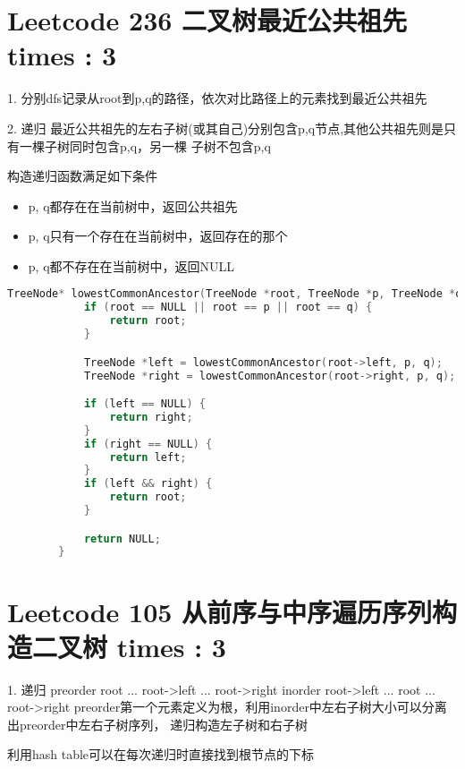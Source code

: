 \documentclass[UTF8]{ctexart}
\begin{document}
\section{Leetcode 236 二叉树最近公共祖先 times : 3}
1. 分别dfs记录从root到p,q的路径，依次对比路径上的元素找到最近公共祖先

2. 递归
最近公共祖先的左右子树(或其自己)分别包含p,q节点,其他公共祖先则是只有一棵子树同时包含p,q，另一棵
子树不包含p,q

构造递归函数满足如下条件
\begin{itemize}
	\item p, q都存在在当前树中，返回公共祖先
	\item p, q只有一个存在在当前树中，返回存在的那个
	\item p, q都不存在在当前树中，返回NULL
\end{itemize}

\begin{framed}
	\begin{lstlisting}[language=C++]
		TreeNode* lowestCommonAncestor(TreeNode *root, TreeNode *p, TreeNode *q) {
			if (root == NULL || root == p || root == q) {
				return root;
			}

			TreeNode *left = lowestCommonAncestor(root->left, p, q);
			TreeNode *right = lowestCommonAncestor(root->right, p, q);

			if (left == NULL) {
				return right;
			}
			if (right == NULL) {
				return left;
			}
			if (left && right) {
				return root;
			}

			return NULL;
		}
	\end{lstlisting}
\end{framed}

\section{Leetcode 105 从前序与中序遍历序列构造二叉树 times : 3}
1. 递归
preorder root ... root->left ... root->right
inorder  root->left ... root ... root->right
preorder第一个元素定义为根，利用inorder中左右子树大小可以分离出preorder中左右子树序列，
递归构造左子树和右子树

利用hash table可以在每次递归时直接找到根节点的下标
\end{document}
